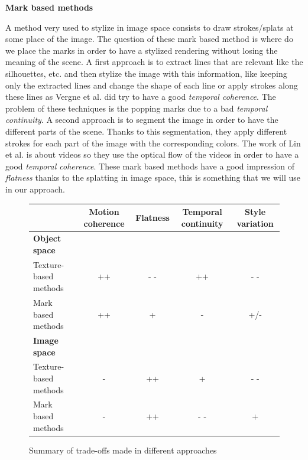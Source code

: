 \textbf{Mark based methods}

A method very used to stylize in image space consists to draw strokes/splats at some place of the image\cite{bleron_motion-coherent_2018, vergne_implicit_2011, benard_active_nodate, zeng_image_2009, grabli_programmable_2010}. The question of these mark based method is where do we place the marks in order to have a stylized rendering without losing the meaning of the scene. A first approach is to extract lines that are relevant like the silhouettes, etc. \cite{vergne_implicit_2011, grabli_programmable_2010, lee_line_nodate} and then stylize the image with this information, like keeping only the extracted lines and change the shape of each line or apply strokes along these lines as Vergne et al.\cite{vergne_implicit_2011} did try to have a good \textit{temporal coherence}. The problem of these techniques is the popping marks due to a bad \textit{temporal continuity}.
A second approach is to segment the image in order to have the different parts of the scene\cite{zeng_image_2009, lin_video_nodate}. Thanks to this segmentation, they apply different strokes for each part of the image with the corresponding colors. The work of Lin et al.\cite{lin_video_nodate} is about videos so they use the optical flow of the videos in order to have a good \textit{temporal coherence}. These mark based methods have a good impression of \textit{flatness} thanks to the splatting in image space, this is something that we will use in our approach.


\begin{figure}

    \begin{tabular}{|l|*{4}{c|}}
    \hline
         & \textbf{Motion coherence} & \textbf{Flatness} & \textbf{Temporal continuity} & \textbf{Style variation} \\
    \hline
    \textbf{Object space} & & & & \\
    \hline
    Texture-based methods & ++ & - - & ++ & - - \\
    \hline
    Mark based methods & ++ & + & - & +/- \\
    \hline
    \textbf{Image space} & & & & \\
    \hline
    Texture-based methods & -  & ++ & + & - - \\
    \hline
    Mark based methods & - & ++ & - - & + \\
    \hline
    \end{tabular}

    \caption{Summary of trade-offs made in different approaches}
    \label{tableau_comparatif}
\end{figure}
